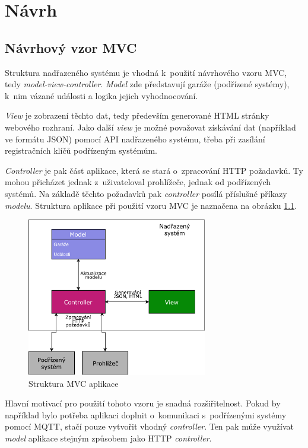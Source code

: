 \chapter{Návrh}
\label{sec:de}

\section{Návrhový vzor MVC}

Struktura nadřazeného systému je vhodná k~použití návrhového vzoru MVC, tedy \textit{model-view-controller}. \textit{Model} zde představují garáže (podřízené systémy), k~nim vázané události a logika jejich vyhodnocování. 

\textit{View} je zobrazení těchto dat, tedy především generované HTML stránky webového rozhraní. Jako další \textit{view} je možné považovat získávání dat (například ve formátu JSON) pomocí API nadřazeného systému, třeba při zasílání registračních klíčů podřízeným systémům.

\textit{Controller} je pak část aplikace, která se stará o~zpracování HTTP požadavků. Ty mohou přicházet jednak z~uživateloval prohlížeče, jednak od podřízených systémů. Na základě těchto požadavků pak \textit{controller} posílá příslušné příkazy \textit{modelu}. Struktura aplikace při použití vzoru MVC je naznačena na obrázku \ref{fig:mvc}.

\begin{figure}[h!]
    \centering
    \includegraphics[width=0.7\textwidth]{images/mvc.pdf}
    \caption{Struktura MVC aplikace}
    \label{fig:mvc}
\end{figure}

Hlavní motivací pro použití tohoto vzoru je snadná rozšiřitelnost. Pokud by například bylo potřeba aplikaci doplnit o~komunikaci s~podřízenými systémy pomocí MQTT, stačí pouze vytvořit vhodný \textit{controller}. Ten pak může využívat \textit{model} aplikace stejným způsobem jako HTTP \textit{controller}.


